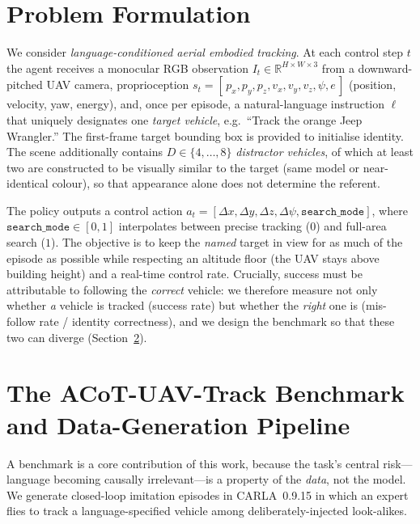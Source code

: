 \documentclass[11pt]{article}
\newcommand{\sys}{ACoT-UAV-Track}
\begin{document}
\section{Problem Formulation}
\label{sec:problem}

We consider \emph{language-conditioned aerial embodied tracking}. At each
control step $t$ the agent receives a monocular RGB observation
$I_t \in \mathbb{R}^{H\times W\times 3}$ from a downward-pitched UAV camera,
proprioception
$s_t = [\,p_{x},p_{y},p_{z},v_{x},v_{y},v_{z},\psi,e\,]$ (position, velocity,
yaw, energy), and, once per episode, a natural-language instruction $\ell$
that uniquely designates one \emph{target vehicle}, e.g.\ ``Track the orange
Jeep Wrangler.'' The first-frame target bounding box is provided to
initialise identity. The scene additionally contains $D \in \{4,\dots,8\}$
\emph{distractor vehicles}, of which at least two are constructed to be
visually similar to the target (same model or near-identical colour), so
that appearance alone does not determine the referent.

The policy outputs a control action
$a_t = [\Delta x, \Delta y, \Delta z, \Delta\psi, \texttt{search\_mode}]$,
where $\texttt{search\_mode} \in [0,1]$ interpolates between precise
tracking ($0$) and full-area search ($1$). The objective is to keep the
\emph{named} target in view for as much of the episode as possible while
respecting an altitude floor (the UAV stays above building height) and a
real-time control rate. Crucially, success must be attributable to
following the \emph{correct} vehicle: we therefore measure not only whether
\emph{a} vehicle is tracked (success rate) but whether the \emph{right} one
is (mis-follow rate / identity correctness), and we design the benchmark so
that these two can diverge (Section~\ref{sec:benchmark}).

\section{The \sys{} Benchmark and Data-Generation Pipeline}
\label{sec:benchmark}

A benchmark is a core contribution of this work, because the task's central
risk---language becoming causally irrelevant---is a property of the
\emph{data}, not the model. We generate closed-loop imitation episodes in
CARLA~0.9.15 \citep{carla} in which an expert flies to track a
language-specified vehicle among deliberately-injected look-alikes.
\end{document}
